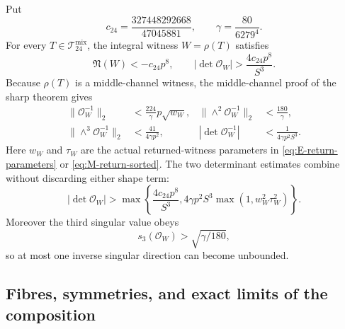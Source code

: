 Put
\[
 c_{24}=\frac{327448292668}{47045881},
 \qquad \gamma=\frac{80}{6279^4}.
\]
For every \(T\in\mathcal T_{24}^{\mathrm{mix}}\), the integral witness
\(W=\rho(T)\) satisfies
\begin{equation}\label{eq:bridge-global-sign}
 \mathfrak N(W)<-c_{24}p^8,\qquad
 |\det\mathscr O_W|>\frac{4c_{24}p^8}{S^3}.
\end{equation}
Because \(\rho(T)\) is a middle-channel witness, the middle-channel proof of
the sharp theorem gives
\begin{align}
 \|\mathscr O_W^{-1}\|_2
 &<\frac{224}{\gamma}p\sqrt {w_W},
 &\|\wedge^2\mathscr O_W^{-1}\|_2
 &<\frac{180}{\gamma},\label{eq:bridge-inverse}\tag{RB1}\\
 \|\wedge^3\mathscr O_W^{-1}\|_2
 &<\frac{41}{4\gamma p^2},
 &|\det\mathscr O_W^{-1}|
 &<\frac1{4\gamma p^2S^3}.\label{eq:bridge-compounds}\tag{RB2}
\end{align}
Here \(w_W\) and \(\tau_W\) are the actual returned-witness parameters in
\eqref{eq:E-return-parameters} or \eqref{eq:M-return-sorted}.  The two
determinant estimates combine without discarding either shape term:
\begin{equation}\label{eq:bridge-det-max}
 |\det\mathscr O_W|>
 \max\left\{
  \frac{4c_{24}p^8}{S^3},
  4\gamma p^2S^3\max(1,w_W^2\tau_W^2)
 \right\}.
\end{equation}
Moreover the third singular value obeys
\[
 s_3(\mathscr O_W)>\sqrt{\gamma/180},
\]
so at most one inverse singular direction can become unbounded.

\subsection{Fibres, symmetries, and exact limits of the composition}

